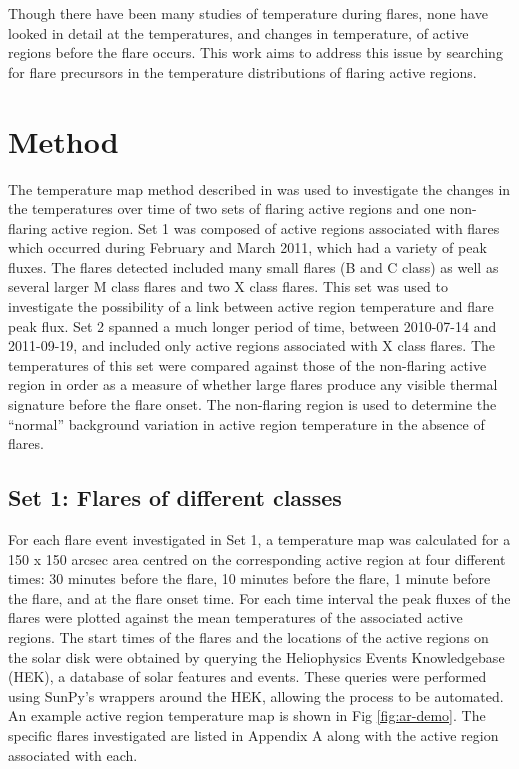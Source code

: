 \documentclass[namedreferences]{solarphysics}
\begin{document}
\begin{article}
Though there have been many studies of temperature during flares, none have looked in detail at the temperatures, and changes in temperature, of active regions before the flare occurs.
This work aims to address this issue by searching for flare precursors in the temperature distributions of flaring active regions.

\section{Method}

The temperature map method described in \cite{Leonard} was used to investigate the changes in the temperatures over time of two sets of flaring active regions and one non-flaring active region.
Set 1 was composed of active regions associated with flares which occurred during February and March 2011, which had a variety of peak fluxes.
The flares detected included many small flares (B and C class) as well as several larger M class flares and two X class flares.
This set was used to investigate the possibility of a link between active region temperature and flare peak flux.
Set 2 spanned a much longer period of time, between 2010-07-14 and 2011-09-19, and included only active regions associated with X class flares.
The temperatures of this set were compared against those of the non-flaring active region in order as a measure of whether large flares produce any visible thermal signature before the flare onset.
The non-flaring region is used to determine the ``normal'' background variation in active region temperature in the absence of flares.

\subsection{Set 1: Flares of different classes}
For each flare event investigated in Set 1, a temperature map was calculated for a 150 x 150 arcsec area centred on the corresponding active region at four different times: 30 minutes before the flare, 10 minutes before the flare, 1 minute before the flare, and at the flare onset time.
For each time interval the peak fluxes of the flares were plotted against the mean temperatures of the associated active regions.
The start times of the flares and the locations of the active regions on the solar disk were obtained by querying the Heliophysics Events Knowledgebase (HEK), a database of solar features and events.
These queries were performed using SunPy's wrappers around the HEK, allowing the process to be automated.
An example active region temperature map is shown in Fig \ref{fig:ar-demo}.
The specific flares investigated are listed in Appendix A along with the active region associated with each. %


\end{article}
\end{document}
